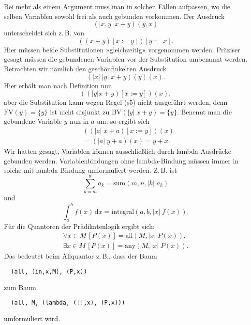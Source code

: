 \documentclass[a4paper,11pt,fleqn,twocolumn,twoside]{article}
\numberwithin{equation}{section}
\begin{document}
Bei mehr als einem Argument muss man in solchen Fällen aufpassen,
wo die selben Variablen sowohl frei als auch gebunden vorkommen.
Der Ausdruck
\begin{equation}
(|x,y|\; x+y)(y,x)
\end{equation}
unterscheidet sich z.\,B. von
\begin{equation}
((x+y)[x:=y])[y:=x].
\end{equation}
Hier müssen beide Substitutionen »gleichzeitig« vorgenommen werden.
Präziser gesagt müssen die gebundenen Variablen vor der Substitution
umbenannt werden. Betrachten wir nämlich den geschönfinkelten
Ausdruck
\begin{equation}
(|x|\;|y|\;x+y)(y)(x).
\end{equation}
Hier erhält man nach Definition nun
\begin{equation}
((|y| x+y)[x:=y])(x),
\end{equation}
aber die Substitution kann wegen Regel (s5) nicht ausgeführt
werden, denn $\mathrm{FV}(y)=\{y\}$ ist nicht disjunkt zu
$\mathrm{BV}(|y|\;x+y)=\{y\}$. Benennt man die gebundene Variable
$y$ nun in $a$ um, so ergibt sich
\begin{equation}
\begin{split}
&((|a|\;x+a)[x:=y])(x)\\
&= (|a|\;y+a)(x) = y+x.
\end{split}
\end{equation}
Wir hatten gesagt, Variablen können ausschließlich durch
lambda-Ausdrücke gebunden werden. Variablenbindungen ohne
lambda-Bindung müssen immer in solche mit lambda-Bindung umformuliert
werden. Z.\,B. ist
\begin{equation}
\sum_{k=m}^n a_k = \mathrm{sum}(m,n,|k|\;a_k)
\end{equation}
und
\begin{equation}
\int_a^b f(x)\,\mathrm dx = \mathrm{integral}(a,b,|x|\;f(x)).
\end{equation}
Für die Quantoren der Prädikatenlogik ergibt sich:
\begin{gather}
\forall x{\in}M\,[P(x)] = \mathrm{all}(M,|x|\;P(x)),\\
\exists x{\in}M\,[P(x)] = \mathrm{any}(M,|x|\;P(x)).
\end{gather}
Das bedeutet beim Allquantor z.\,B., dass der Baum
\begin{verbatim}
  (all, (in,x,M), (P,x))
\end{verbatim}
zum Baum
\begin{verbatim}
  (all, M, (lambda, ([],x), (P,x)))
\end{verbatim}
umformuliert wird.
\end{document}
